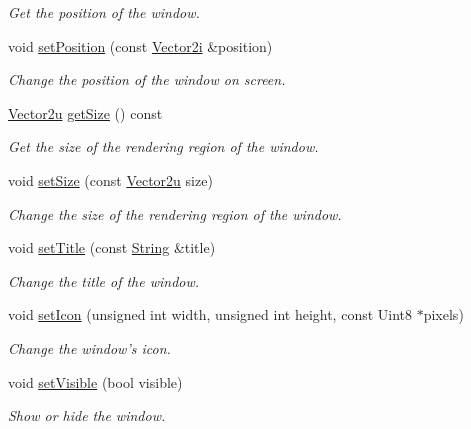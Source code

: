 \begin{DoxyCompactItemize}
\begin{DoxyCompactList}\small\item\em Get the position of the window. \end{DoxyCompactList}\item 
void \hyperlink{classsf_1_1Window_a6c4078bfbf61c29bfc4b4732ce764f17}{set\-Position} (const \hyperlink{classsf_1_1Vector2}{Vector2i} \&position)
\begin{DoxyCompactList}\small\item\em Change the position of the window on screen. \end{DoxyCompactList}\item 
\hyperlink{classsf_1_1Vector2}{Vector2u} \hyperlink{classsf_1_1Window_ad2b55a731ba1680fe67292991ef1610e}{get\-Size} () const 
\begin{DoxyCompactList}\small\item\em Get the size of the rendering region of the window. \end{DoxyCompactList}\item 
void \hyperlink{classsf_1_1Window_ad6513418bb2963347cd1819a1810524d}{set\-Size} (const \hyperlink{classsf_1_1Vector2}{Vector2u} size)
\begin{DoxyCompactList}\small\item\em Change the size of the rendering region of the window. \end{DoxyCompactList}\item 
void \hyperlink{classsf_1_1Window_a3b3f3513bb6be90f5cd456c20b5fd5fa}{set\-Title} (const \hyperlink{classsf_1_1String}{String} \&title)
\begin{DoxyCompactList}\small\item\em Change the title of the window. \end{DoxyCompactList}\item 
void \hyperlink{classsf_1_1Window_a63af61e026fba08e3153fd013620bcc0}{set\-Icon} (unsigned int width, unsigned int height, const Uint8 $\ast$pixels)
\begin{DoxyCompactList}\small\item\em Change the window's icon. \end{DoxyCompactList}\item 
void \hyperlink{classsf_1_1Window_a160f7f11a207603d7e99ce606e749703}{set\-Visible} (bool visible)
\begin{DoxyCompactList}\small\item\em Show or hide the window. \end{DoxyCompactList}\item 

\end{DoxyCompactItemize}
